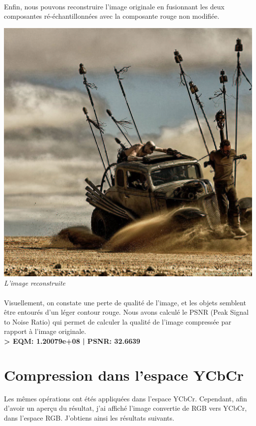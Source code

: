 \documentclass[a4paper,11pt]{article}
\begin{document}
\paragraph{} Enfin, nous pouvons reconstruire l'image originale en fusionnant les deux composantes ré-échantillonnées avec la composante rouge non modifiée.

\begin{center}
\includegraphics[scale=0.5]{./imgs/madmaxCompRGB.png}\\
\textit{L'image reconstruite}
\end{center}

\paragraph{} Visuellement, on constate une perte de qualité de l'image, et les objets semblent être entourés d'un léger contour rouge.  Nous avons calculé le PSNR (Peak Signal to Noise Ratio) qui permet de calculer la qualité de l'image compressée par rapport à l'image originale.\\
\textbf{> EQM: 1.20079e+08 | PSNR: 32.6639}

\newpage

\section{Compression dans l'espace YCbCr}
Les mêmes opérations ont étés appliquées dans l'espace YCbCr. Cependant, afin d'avoir un aperçu du résultat, j'ai affiché l'image convertie de RGB vers YCbCr, dans l'espace RGB. J'obtiens ainsi les résultats suivants.
\end{document}
